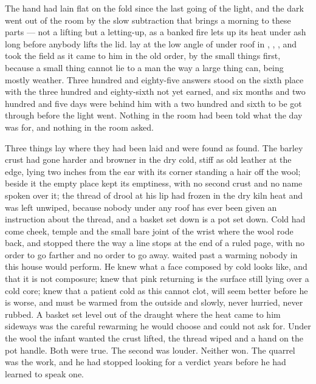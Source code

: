 
The hand had lain flat on the fold since the last going of the light, and the dark went out of the room by the slow subtraction that brings a morning to these parts --- not a lifting but a letting-up, as a banked fire lets up its heat under ash long before anybody lifts the lid.  lay at the low angle of  under  roof in , , , and took the field as it came to him in the old order, by the small things first, because a small thing cannot lie to a man the way a large thing can, being mostly weather. Three hundred and eighty-five answers stood on the sixth place with the three hundred and eighty-sixth not yet earned, and six months and two hundred and five days were behind him with a two hundred and sixth to be got through before the light went. Nothing in the room had been told what the day was for, and nothing in the room asked.

Three things lay where they had been laid and were found as found. The barley crust had gone harder and browner in the dry cold, stiff as old leather at the edge, lying two inches from the ear with its corner standing a hair off the wool; beside it the empty place kept its emptiness, with no second crust and no name spoken over it; the thread of drool at his lip had frozen in the dry kiln heat and was left unwiped, because nobody under any roof has ever been given an instruction about the thread, and a basket set down is a pot set down. Cold had come cheek, temple and the small bare joint of the wrist where the wool rode back, and stopped there the way a line stops at the end of a ruled page, with no order to go farther and no order to go away.  waited past a warming nobody in this house would perform. He knew what a face composed by cold looks like, and that it is not composure; knew that pink returning is the surface still lying over a cold core; knew that a patient cold as this cannot clot, will seem better before he is worse, and must be warmed from the outside and slowly, never hurried, never rubbed. A basket set level out of the draught where the heat came to him sideways was the careful rewarming he would choose and could not ask for. Under the wool the infant wanted the crust lifted, the thread wiped and a hand on the pot handle. Both were true. The second was louder. Neither won. The quarrel was the work, and he had stopped looking for a verdict years before he had learned to speak one.

